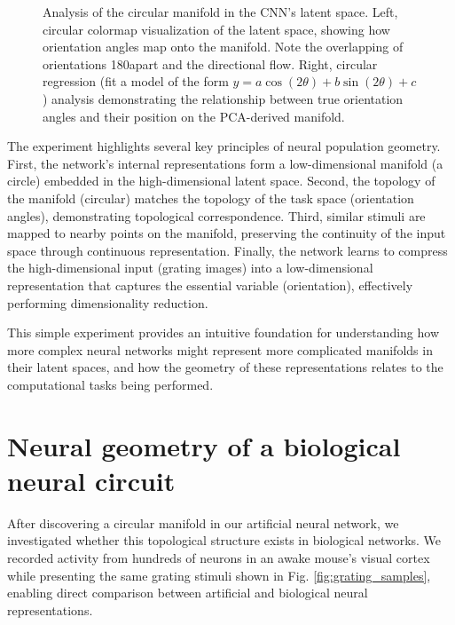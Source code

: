\documentclass[11pt,a4paper]{article}
\begin{document}
\begin{figure}[h!]
\begin{subfigure}[b]{0.48\textwidth}
        \label{fig:circular_regression}
    \end{subfigure}
    \caption{Analysis of the circular manifold in the CNN's latent space. Left, circular colormap visualization of the latent space, showing how orientation angles map onto the manifold. Note the overlapping of orientations 180\textdegree apart and the directional flow. Right, circular regression (fit   a model of the form $y = a\cos(2\theta) + b\sin(2\theta) + c$) analysis demonstrating the relationship between true orientation angles and their position on the PCA-derived manifold.}
    \label{fig:manifold_analysis}
\end{figure}

The experiment highlights several key principles of neural population geometry. First, the network's internal representations form a low-dimensional manifold (a circle) embedded in the high-dimensional latent space. Second, the topology of the manifold (circular) matches the topology of the task space (orientation angles), demonstrating topological correspondence. Third, similar stimuli are mapped to nearby points on the manifold, preserving the continuity of the input space through continuous representation. Finally, the network learns to compress the high-dimensional input (grating images) into a low-dimensional representation that captures the essential variable (orientation), effectively performing dimensionality reduction.

This simple experiment provides an intuitive foundation for understanding how more complex neural networks might represent more complicated manifolds in their latent spaces, and how the geometry of these representations relates to the computational tasks being performed.

\section{Neural geometry of a biological neural circuit}

After discovering a circular manifold in our artificial neural network, we investigated whether this topological structure exists in biological networks. We recorded activity from hundreds of neurons in an awake mouse's visual cortex while presenting the same grating stimuli shown in Fig. \ref{fig:grating_samples}, enabling direct comparison between artificial and biological neural representations.
\end{document}
